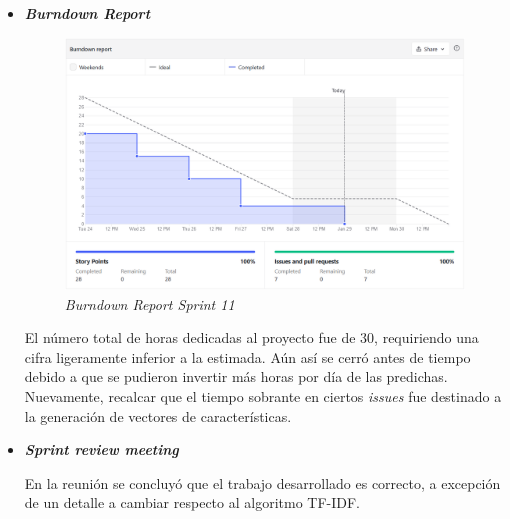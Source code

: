 \begin{itemize}
	\item \textbf{\textit{Burndown Report}}
	\begin{figure}[h]
		\caption[\textit{Sprint} 11: \textit{burndown report}]{\textit{Burndown Report Sprint 11}}
		\centering
		\includegraphics[width=\textwidth]{../img/anexos/bdr/s11_bdr}
	\end{figure}
	
	El número total de horas dedicadas al proyecto fue de $30$, requiriendo una cifra ligeramente inferior a la estimada. Aún así se cerró antes de tiempo debido a que se pudieron invertir más horas por día de las predichas. Nuevamente, recalcar que el tiempo sobrante en ciertos \textit{issues} fue destinado a la generación de vectores de características.
	
	\item \textbf{\textit{Sprint review meeting}}
	
	En la reunión se concluyó que el trabajo desarrollado es correcto, a excepción de un detalle a cambiar respecto al algoritmo TF-IDF.
	
\end{itemize}
